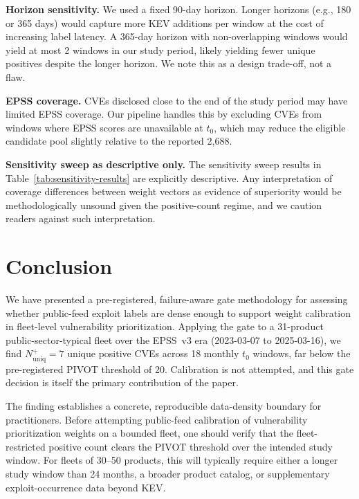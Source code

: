 \documentclass[conference]{IEEEtran}
\begin{document}
\textbf{Horizon sensitivity.} We used a fixed 90-day horizon. Longer
horizons (e.g., 180 or 365 days) would capture more KEV additions per
window at the cost of increasing label latency. A 365-day horizon with
non-overlapping windows would yield at most 2 windows in our study period,
likely yielding fewer unique positives despite the longer horizon. We
note this as a design trade-off, not a flaw.

\textbf{EPSS coverage.} CVEs disclosed close to the end of the study
period may have limited EPSS coverage. Our pipeline handles this by
excluding CVEs from windows where EPSS scores are unavailable at $t_0$,
which may reduce the eligible candidate pool slightly relative to the
reported 2,688.

\textbf{Sensitivity sweep as descriptive only.} The sensitivity sweep
results in Table~\ref{tab:sensitivity-results} are explicitly descriptive.
Any interpretation of coverage differences between weight vectors as
evidence of superiority would be methodologically unsound given the
positive-count regime, and we caution readers against such interpretation.

\section{Conclusion}
\label{sec:conclusion}

We have presented a pre-registered, failure-aware gate methodology for
assessing whether public-feed exploit labels are dense enough to support
weight calibration in fleet-level vulnerability prioritization. Applying
the gate to a 31-product public-sector-typical fleet over the EPSS~v3 era
(2023-03-07 to 2025-03-16), we find $N^+_{\text{uniq}} = 7$ unique positive
CVEs across 18 monthly $t_0$ windows, far below the pre-registered PIVOT
threshold of 20. Calibration is not attempted, and this gate decision is
itself the primary contribution of the paper.

The finding establishes a concrete, reproducible data-density boundary for
practitioners. Before attempting public-feed calibration of vulnerability
prioritization weights on a bounded fleet, one should verify that the
fleet-restricted positive count clears the PIVOT threshold over the intended
study window. For fleets of 30--50 products, this will typically require
either a longer study window than 24 months, a broader product catalog, or
supplementary exploit-occurrence data beyond KEV.
\end{document}
